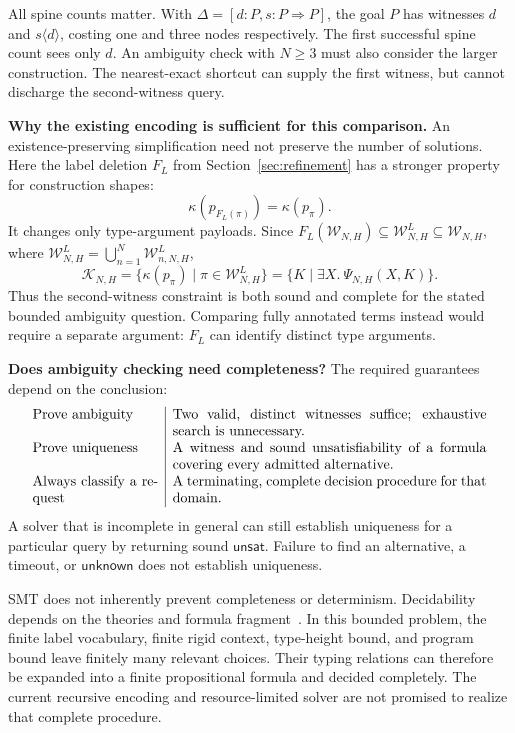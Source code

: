 \documentclass[10pt,a4paper]{article}
\newcommand{\iarg}[1]{\langle#1\rangle}
\begin{document}
All spine counts matter. With $\Delta=[d:P,s:P\Rightarrow P]$, the goal $P$
has witnesses $d$ and $s\iarg{d}$, costing one and three nodes respectively.
The first successful spine count sees only $d$. An ambiguity check with $N\ge3$
must also consider the larger construction. The nearest-exact shortcut can
supply the first witness, but cannot discharge the second-witness query.

\textbf{Why the existing encoding is sufficient for this comparison.}
An existence-preserving simplification need not preserve the number of solutions.
Here the label deletion $F_L$ from Section~\ref{sec:refinement} has a stronger
property for construction shapes:
\[
 \kappa(p_{F_L(\pi)})=\kappa(p_\pi).
\]
It changes only type-argument payloads. Since
$F_L(\mathcal W_{N,H})\subseteq\mathcal W^L_{N,H}
 \subseteq\mathcal W_{N,H}$, where
$\mathcal W^L_{N,H}=\bigcup_{n=1}^{N}\mathcal W^L_{n,N,H}$,
\[
 \boxed{\mathcal K_{N,H}
   =\{\kappa(p_\pi)\mid\pi\in\mathcal W^L_{N,H}\}
   =\{K\mid\exists X.\ \Psi_{N,H}(X,K)\}.}
\]
Thus the second-witness constraint is both sound and complete for the stated
bounded ambiguity question. Comparing fully annotated terms instead would
require a separate argument: $F_L$ can identify distinct type arguments.

\textbf{Does ambiguity checking need completeness?}
The required guarantees depend on the conclusion:
\[
\begin{array}{p{0.26\linewidth}|p{0.65\linewidth}}
 Prove ambiguity & Two valid, distinct witnesses suffice; exhaustive search is unnecessary.\\[4pt]
 Prove uniqueness & A witness and sound unsatisfiability of a formula covering every admitted alternative.\\[4pt]
 Always classify a request & A terminating, complete decision procedure for that domain.
\end{array}
\]
A solver that is incomplete in general can still establish uniqueness for a
particular query by returning sound $\mathsf{unsat}$. Failure to find an
alternative, a timeout, or $\mathsf{unknown}$ does not establish uniqueness.

SMT does not inherently prevent completeness or determinism. Decidability depends
on the theories and formula fragment~\cite{smt-theories}. In this bounded problem,
the finite label vocabulary, finite rigid context, type-height bound, and program
bound leave finitely many relevant choices. Their typing relations can therefore
be expanded into a finite propositional formula and decided completely. The
current recursive encoding and resource-limited solver are not promised to
realize that complete procedure.
\end{document}
